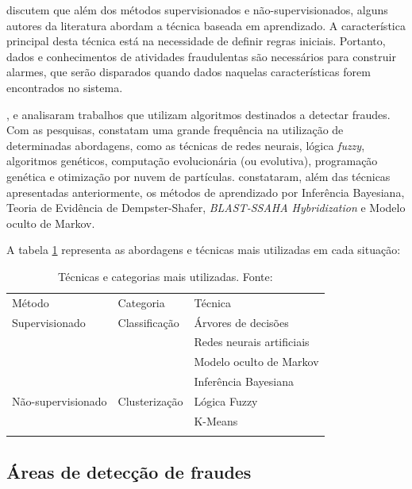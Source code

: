 \documentclass[smallextended]{svjour3}
\begin{document}
\cite{Rebahi2011} discutem que além dos métodos supervisionados e não-supervisionados, alguns autores da literatura abordam a técnica baseada em aprendizado. A característica principal desta técnica está na necessidade de definir regras iniciais. Portanto, dados e conhecimentos de atividades fraudulentas são necessários para construir alarmes, que serão disparados quando dados naquelas características forem encontrados no sistema.

\cite{Pejic-Bach2010}, \cite{Wang2010} e \cite{Raj2011} analisaram trabalhos que utilizam algoritmos destinados a detectar fraudes. Com as pesquisas, constatam uma grande frequência na utilização de determinadas abordagens, como as técnicas de redes neurais, lógica \emph{fuzzy}, algoritmos genéticos, computação evolucionária (ou evolutiva), programação genética e otimização por nuvem de partículas. \cite{Raj2011} constataram, além das técnicas apresentadas anteriormente, os métodos de aprendizado por Inferência Bayesiana, Teoria de Evidência de Dempster-Shafer, \emph{BLAST-SSAHA Hybridization} e Modelo oculto de Markov.

A tabela \ref{tab:tecnologias} representa as abordagens e técnicas mais utilizadas em cada situação:

\begin{table}
	\caption{Técnicas e categorias mais utilizadas. Fonte: \cite{Abdallah2016}}
	\label{tab:tecnologias}       %
	\begin{tabular}[!Ht]{lll}
		\hline\noalign{\smallskip}
		Método & Categoria & Técnica  \\
		\noalign{\smallskip}\hline\noalign{\smallskip}
		Supervisionado & Classificação & Árvores de decisões \\
		 &  & Redes neurais artificiais \\
		 &  & Modelo oculto de Markov \\
		 &  &  Inferência Bayesiana\\
		Não-supervisionado & Clusterização & Lógica Fuzzy \\
		 &  & K-Means  \\
		\noalign{\smallskip}\hline
	\end{tabular}
\end{table}

\subsection{Áreas de detecção de fraudes}
	
\end{document}
